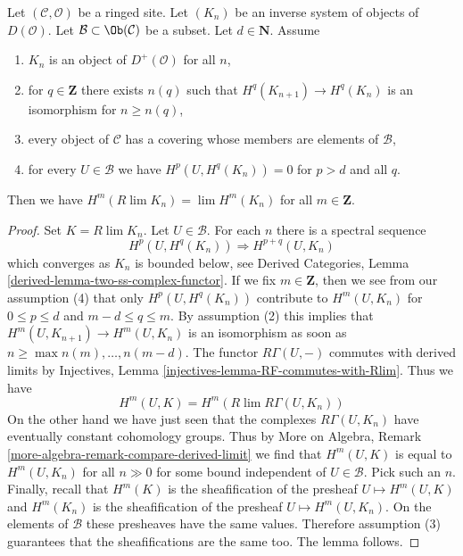 \begin{lemma}
\label{lemma-Rlim-of-system}
Let $(\mathcal{C}, \mathcal{O})$ be a ringed site. Let $(K_n)$
be an inverse system of objects of $D(\mathcal{O})$.
Let $\mathcal{B} \subset \Ob(\mathcal{C})$ be a subset.
Let $d \in \mathbf{N}$. Assume
\begin{enumerate}
\item $K_n$ is an object of $D^+(\mathcal{O})$ for all $n$,
\item for $q \in \mathbf{Z}$ there exists
$n(q)$ such that $H^q(K_{n + 1}) \to H^q(K_n)$ is an isomorphism for
$n \geq n(q)$,
\item every object of $\mathcal{C}$ has a covering whose members are
elements of $\mathcal{B}$,
\item for every $U \in \mathcal{B}$ we have $H^p(U, H^q(K_n)) = 0$
for $p > d$ and all $q$.
\end{enumerate}
Then we have $H^m(R\lim K_n) = \lim H^m(K_n)$ for all $m \in \mathbf{Z}$.
\end{lemma}

\begin{proof}
Set $K = R\lim K_n$. Let $U \in \mathcal{B}$. For each $n$ there is a spectral
sequence
$$
H^p(U, H^q(K_n)) \Rightarrow H^{p + q}(U, K_n)
$$
which converges as $K_n$ is bounded below, see
Derived Categories, Lemma \ref{derived-lemma-two-ss-complex-functor}.
If we fix $m \in \mathbf{Z}$, then we see from our assumption (4)
that only $H^p(U, H^q(K_n))$ contribute to $H^m(U, K_n)$
for $0 \leq p \leq d$ and $m - d \leq q \leq m$. By assumption (2)
this implies that $H^m(U, K_{n + 1}) \to H^m(U, K_n)$ is an isomorphism
as soon as $n \geq \max{n(m), \ldots, n(m - d)}$. The functor $R\Gamma(U, -)$
commutes with derived limits by
Injectives, Lemma \ref{injectives-lemma-RF-commutes-with-Rlim}.
Thus we have
$$
H^m(U, K) = H^m(R\lim R\Gamma(U, K_n))
$$
On the other hand we have just seen that the complexes $R\Gamma(U, K_n)$
have eventually constant cohomology groups. Thus by
More on Algebra, Remark \ref{more-algebra-remark-compare-derived-limit}
we find that $H^m(U, K)$ is equal to $H^m(U, K_n)$ for
all $n \gg 0$ for some bound independent of $U \in \mathcal{B}$.
Pick such an $n$. Finally, recall that $H^m(K)$ is the sheafification of
the presheaf $U \mapsto H^m(U, K)$ and $H^m(K_n)$ is the sheafification
of the presheaf $U \mapsto H^m(U, K_n)$. On the elements
of $\mathcal{B}$ these presheaves have the same values. Therefore assumption
(3) guarantees that the sheafifications are the same too.
The lemma follows.
\end{proof}

